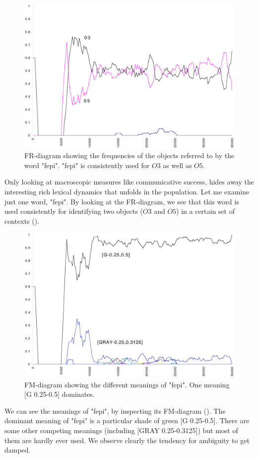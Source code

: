 \begin{figure}[htbp]
  \centerline{\includegraphics[width=.80\textwidth]{chap7/figs/FR-FEPI}}
\caption{ \label{fr-fepi} FR-diagram showing the frequencies
of the objects referred to by the word
"fepi". "fepi" is consistently used for $O3$ as well as
$O5$.}
\end{figure}
Only looking at macroscopic measures like communicative
success, hides away the
interesting rich lexical dynamics that unfolds
in the population. Let me examine just one word, "fepi". 
By looking at the FR-diagram, we see that this word is 
used consistently for identifying two objects
($O3$ and $O5$) in a certain set of contexts
(). 
\begin{figure}[htbp]
  \centerline{\includegraphics[width=.80\textwidth]{chap7/figs/FM-FEPI}}
\caption{ \label{fm-fepi} FM-diagram showing the different
meanings of "fepi". One meaning [G 0.25-0.5] dominates.}
\end{figure}
We can see the meanings of "fepi", by 
inspecting its FM-diagram (). 
The dominant meaning of "fepi" is 
a particular shade of green [G 0.25-0.5]. There are 
some other competing meanings (including [GRAY 0.25-0.3125])
but most of them are hardly ever used. We observe clearly 
the tendency for ambiguity to get damped. 

